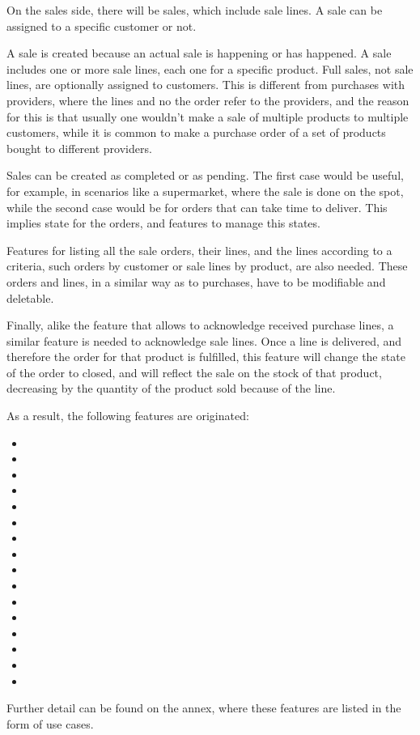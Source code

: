 On the sales side, there will be sales, which include sale lines. A sale can be assigned to a specific customer or not.

A sale is created because an actual sale is happening or has happened. A sale includes one or more sale lines, each one for a specific product. Full sales, not sale lines, are optionally assigned to customers. This is different from purchases with providers, where the lines and no the order refer to the providers, and the reason for this is that usually one wouldn’t make a sale of multiple products to multiple customers, while it is common to make a purchase order of a set of products bought to different providers.

Sales can be created as completed or as pending. The first case would be useful, for example, in scenarios like a supermarket, where the sale is done on the spot, while the second case would be for orders that can take time to deliver. This implies state for the orders, and features to manage this states.

Features for listing all the sale orders, their lines, and the lines according to a criteria, such orders by customer or sale lines by product, are also needed. These orders and lines, in a similar way as to purchases, have to be modifiable and deletable.

Finally, alike the feature that allows to acknowledge received purchase lines, a similar feature is needed to acknowledge sale lines. Once a line is delivered, and therefore the order for that product is fulfilled, this feature will change the state of the order to closed, and will reflect the sale on the stock of that product, decreasing by the quantity of the product sold because of the line.

As a result, the following features are originated:

\begin{itemize}
\item {}
\item {}
\item {}
\item {}
\item {}
\item {}
\item {}
\item {}
\item {}
\item {}
\item {}
\item {}
\item {}
\item {}
\item {}
\item {}
\end{itemize}

Further detail can be found on the annex, where these features are listed in the form of use cases.